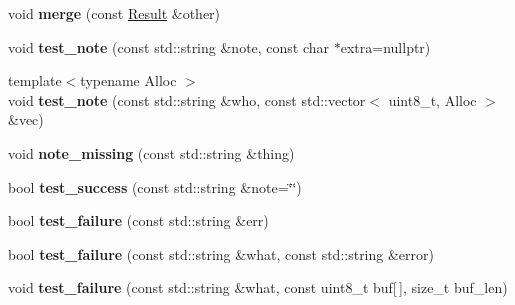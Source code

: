 \begin{DoxyCompactItemize}
\mbox{\label{class_botan___tests_1_1_test_1_1_result_a2adc4f7a5bc78225973eb44c1a56eafa}} 
void {\bfseries merge} (const \mbox{\hyperlink{class_botan___tests_1_1_test_1_1_result}{Result}} \&other)
\item 
\mbox{\label{class_botan___tests_1_1_test_1_1_result_a0ccdd529da7f65919186e5c88d7efc3b}} 
void {\bfseries test\+\_\+note} (const std\+::string \&note, const char $\ast$extra=nullptr)
\item 
\mbox{\label{class_botan___tests_1_1_test_1_1_result_a44da112ef429a7c8ea4abde3e002469b}} 
{\footnotesize template$<$typename Alloc $>$ }\\void {\bfseries test\+\_\+note} (const std\+::string \&who, const std\+::vector$<$ uint8\+\_\+t, Alloc $>$ \&vec)
\item 
\mbox{\label{class_botan___tests_1_1_test_1_1_result_aa4a2e29f65dcb83a56ad1497d32c4716}} 
void {\bfseries note\+\_\+missing} (const std\+::string \&thing)
\item 
\mbox{\label{class_botan___tests_1_1_test_1_1_result_afb15de9111effddcffe63216cf707ef5}} 
bool {\bfseries test\+\_\+success} (const std\+::string \&note=\char`\"{}\char`\"{})
\item 
\mbox{\label{class_botan___tests_1_1_test_1_1_result_ab1aa13d1eeefdc6a6121432b3d17a97e}} 
bool {\bfseries test\+\_\+failure} (const std\+::string \&err)
\item 
\mbox{\label{class_botan___tests_1_1_test_1_1_result_aa43dffe12171589574815a04ac36786b}} 
bool {\bfseries test\+\_\+failure} (const std\+::string \&what, const std\+::string \&error)
\item 
\mbox{\label{class_botan___tests_1_1_test_1_1_result_a15c4a78f6ed93cdea8d437618bd86c6f}} 
void {\bfseries test\+\_\+failure} (const std\+::string \&what, const uint8\+\_\+t buf\mbox{[}$\,$\mbox{]}, size\+\_\+t buf\+\_\+len)
\item 

\end{DoxyCompactItemize}
